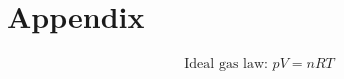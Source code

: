 \section{Appendix}
    
    \begin{align}
        \text{Ideal gas law: } pV = nRT \label{eq_igl}
    \end{align}
